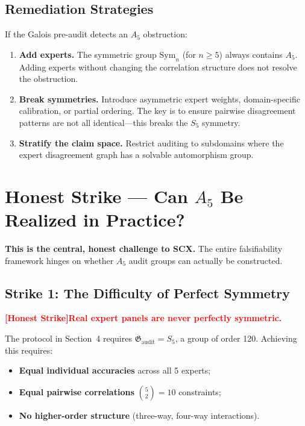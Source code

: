 \documentclass[12pt,a4paper]{article}
\theoremstyle{remark}
\newcommand{\Sym}{\mathrm{Sym}}
\newcommand{\AuditGrp}{\mathfrak{G}_{\mathrm{audit}}}
\newcommand{\honestcrit}[1]{%
    \textcolor{red}{\textbf{[Honest Strike]#1}}%
}
\begin{document}
\subsection{Remediation Strategies}
If the Galois pre-audit detects an \(A_5\) obstruction:
\begin{enumerate}[label=(\arabic*),itemsep=3pt]
    \item \textbf{Add experts.} The symmetric group \(\Sym_n\) (for \(n \geq 5\)) always contains \(A_5\). Adding experts without changing the correlation structure does not resolve the obstruction.
    \item \textbf{Break symmetries.} Introduce asymmetric expert weights, domain-specific calibration, or partial ordering. The key is to ensure pairwise disagreement patterns are not all identical---this breaks the \(S_5\) symmetry.
    \item \textbf{Stratify the claim space.} Restrict auditing to subdomains where the expert disagreement graph has a solvable automorphism group.
\end{enumerate}
\section{Honest Strike --- Can \(A_5\) Be Realized in Practice?}
\textbf{This is the central, honest challenge to SCX.} The entire falsifiability framework hinges on whether \(A_5\) audit groups can actually be constructed.

\subsection{Strike 1: The Difficulty of Perfect Symmetry}
\honestcrit{Real expert panels are never perfectly symmetric.}

The protocol in Section~4 requires \(\AuditGrp = S_5\), a group of order 120. Achieving this requires:
\begin{itemize}[itemsep=3pt]
    \item \textbf{Equal individual accuracies} across all 5 experts;
    \item \textbf{Equal pairwise correlations} \(\binom{5}{2} = 10\) constraints;
    \item \textbf{No higher-order structure} (three-way, four-way interactions).
\end{itemize}
\end{document}
